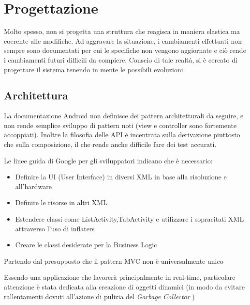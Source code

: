 \chapter{Progettazione} %

\label{Capitolo4} %


Molto spesso, non si progetta una struttura che reagisca in maniera elastica ma coerente alle modifiche.
Ad aggravare la situazione, i cambiamenti effettuati non sempre sono documentati per cui le specifiche non vengono aggiornate e ciò rende i cambiamenti futuri difficili da compiere. Conscio di tale realtà, si è cercato di progettare il sistema tenendo in mente le possibili evoluzioni.

\section{Architettura}

La documentazione Android non definisce dei pattern architetturali da seguire, e non rende semplice sviluppo di pattern noti (view e controller sono fortemente accoppiati). Inoltre la filosofia delle API è incentrata sulla derivazione piuttosto che sulla composizione, il che rende anche difficile fare dei test accurati.

Le linee guida di Google per gli sviluppatori indicano che è necessario:

\begin{itemize}
\item Definire la UI (User Interface) in diversi XML in base alla risoluzione e all'hardware
\item Definire le risorse in altri XML
\item Estendere classi come ListActivity,TabActivity e utilizzare i sopracitati XML attraverso l'uso di inflaters
\item Creare le classi desiderate per la Business Logic
\end{itemize}

Partendo dal presupposto che il pattern MVC non è universalmente unico

Essendo una applicazione che lavorerà principalmente in real-time, particolare attenzione è stata dedicata alla creazione di oggetti dinamici (in modo da evitare rallentamenti dovuti all'azione di pulizia del \textit{Garbage Collector} )


